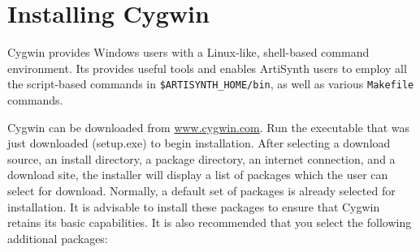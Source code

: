 \documentclass{article}
\begin{document}
%
%
%

%
%
%

\section{Installing Cygwin}
\label{CygwinInstallationSec}

Cygwin provides Windows users with a Linux-like, shell-based command
environment.  Its provides useful tools and enables ArtiSynth users to
employ all the script-based commands in {\tt \$ARTISYNTH\_HOME/bin}, as well
as various {\tt Makefile} commands.

Cygwin can be downloaded from 
\href{http://www.cygwin.com}{www.cygwin.com}. Run the
executable that was just downloaded (setup.exe) to begin
installation. After selecting a download source, an install directory,
a package directory, an internet connection, and a download site, the
installer will display a list of packages which the user can select
for download. Normally, a default set of packages is already selected
for installation. It is advisable to install these packages to ensure
that Cygwin retains its basic capabilities. It is also recommended
that you select the following additional packages:
\end{document}
